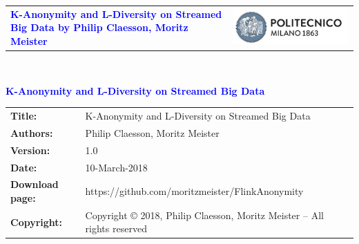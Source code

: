 

\renewcommand\thesubsection{\Alph{subsection}}




\begin{titlepage}



{\begin{table}[t!]
\centering
\begin{tabu} to \textwidth { X[1.3,r,p] X[1.7,l,p] }
\textcolor{Blue}
{\textbf{\small{K-Anonymity and L-Diversity on Streamed Big Data by Philip Claesson, Moritz Meister}}} & \includegraphics[scale=0.5]{Images/PolimiLogo}
\end{tabu}
\end{table}}~\\ [7cm]


\begin{flushleft}

{\textcolor{Blue}{\textbf{\Huge{K-Anonymity and L-Diversity on Streamed Big Data}}}} \\ [1cm]

\end{flushleft}

\end{titlepage}

\begin{table}[h!]
\begin{tabu} to \textwidth { X[0.3,r,p] X[0.7,l,p] }
\hline

\textbf{Title:} & K-Anonymity and L-Diversity on Streamed Big Data \\
\textbf{Authors:} & Philip Claesson, Moritz Meister \\
\textbf{Version:} & 1.0 \\ 
\textbf{Date:} & 10-March-2018 \\
\textbf{Download page:} & https://github.com/moritzmeister/FlinkAnonymity \\
\textbf{Copyright:} & Copyright © 2018, Philip Claesson, Moritz Meister – All rights reserved \\
\hline
\end{tabu}
\end{table}




